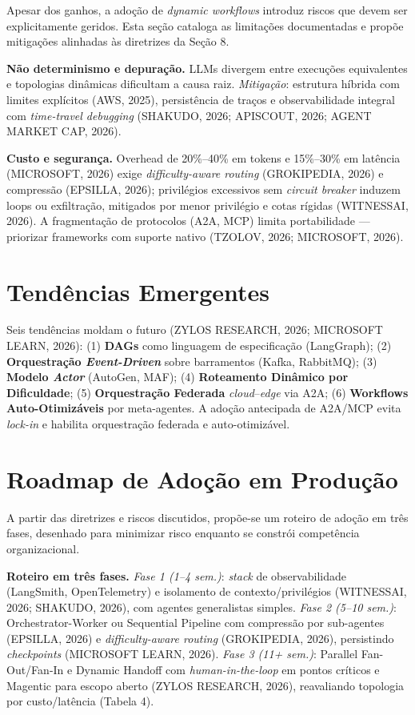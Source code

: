 \documentclass[12pt,a4paper]{article}
\begin{document}
Apesar dos ganhos, a adoção de \textit{dynamic workflows} introduz riscos que devem ser explicitamente geridos. Esta seção cataloga as limitações documentadas e propõe mitigações alinhadas às diretrizes da Seção 8.

\textbf{Não determinismo e depuração.} LLMs divergem entre execuções equivalentes e topologias dinâmicas dificultam a causa raiz. \textit{Mitigação}: estrutura híbrida com limites explícitos (AWS, 2025), persistência de traços e observabilidade integral com \textit{time-travel debugging} (SHAKUDO, 2026; APISCOUT, 2026; AGENT MARKET CAP, 2026).

\textbf{Custo e segurança.} Overhead de 20\%–40\% em tokens e 15\%–30\% em latência (MICROSOFT, 2026) exige \textit{difficulty-aware routing} (GROKIPEDIA, 2026) e compressão (EPSILLA, 2026); privilégios excessivos sem \textit{circuit breaker} induzem loops ou exfiltração, mitigados por menor privilégio e cotas rígidas (WITNESSAI, 2026). A fragmentação de protocolos (A2A, MCP) limita portabilidade — priorizar frameworks com suporte nativo (TZOLOV, 2026; MICROSOFT, 2026).


\section{Tendências Emergentes}

Seis tendências moldam o futuro (ZYLOS RESEARCH, 2026; MICROSOFT LEARN, 2026): (1) \textbf{DAGs} como linguagem de especificação (LangGraph); (2) \textbf{Orquestração \textit{Event-Driven}} sobre barramentos (Kafka, RabbitMQ); (3) \textbf{Modelo \textit{Actor}} (AutoGen, MAF); (4) \textbf{Roteamento Dinâmico por Dificuldade}; (5) \textbf{Orquestração Federada} \textit{cloud}–\textit{edge} via A2A; (6) \textbf{Workflows Auto-Otimizáveis} por meta-agentes. A adoção antecipada de A2A/MCP evita \textit{lock-in} e habilita orquestração federada e auto-otimizável.


\section{Roadmap de Adoção em Produção}

A partir das diretrizes e riscos discutidos, propõe-se um roteiro de adoção em três fases, desenhado para minimizar risco enquanto se constrói competência organizacional.

\textbf{Roteiro em três fases.} \textit{Fase 1 (1–4 sem.)}: \textit{stack} de observabilidade (LangSmith, OpenTelemetry) e isolamento de contexto/privilégios (WITNESSAI, 2026; SHAKUDO, 2026), com agentes generalistas simples. \textit{Fase 2 (5–10 sem.)}: Orchestrator-Worker ou Sequential Pipeline com compressão por sub-agentes (EPSILLA, 2026) e \textit{difficulty-aware routing} (GROKIPEDIA, 2026), persistindo \textit{checkpoints} (MICROSOFT LEARN, 2026). \textit{Fase 3 (11+ sem.)}: Parallel Fan-Out/Fan-In e Dynamic Handoff com \textit{human-in-the-loop} em pontos críticos e Magentic para escopo aberto (ZYLOS RESEARCH, 2026), reavaliando topologia por custo/latência (Tabela 4).
\end{document}
